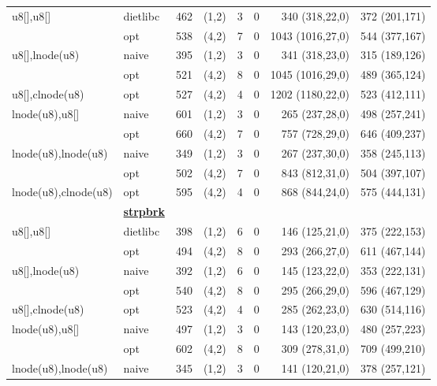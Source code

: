 \begin{table}
\begin{center}
\begin{scriptsize}
\begin{tabular}{@{\hspace{2mm}}l@{\hspace{2mm}}l@{\hspace{2mm}}r@{\hspace{2mm}}c@{\hspace{2mm}}r@{\hspace{2mm}}r@{\hspace{2mm}}r@{\hspace{2mm}}r@{\hspace{2mm}}}
u8[],u8[]             & dietlibc     & 462  & (1,2) & 3  & 0 & 340 (318,22,0)      & 372 (201,171)      \\
                      & opt          & 538  & (4,2) & 7  & 0 & 1043 (1016,27,0)    & 544 (377,167)      \\
u8[],lnode(u8)        & naive        & 395  & (1,2) & 3  & 0 & 341 (318,23,0)      & 315 (189,126)      \\
                      & opt          & 521  & (4,2) & 8  & 0 & 1045 (1016,29,0)    & 489 (365,124)      \\
u8[],clnode(u8)       & opt          & 527  & (4,2) & 4  & 0 & 1202 (1180,22,0)    & 523 (412,111)      \\
lnode(u8),u8[]        & naive        & 601  & (1,2) & 3  & 0 & 265 (237,28,0)      & 498 (257,241)      \\
                      & opt          & 660  & (4,2) & 7  & 0 & 757 (728,29,0)      & 646 (409,237)      \\
lnode(u8),lnode(u8)   & naive        & 349  & (1,2) & 3  & 0 & 267 (237,30,0)      & 358 (245,113)      \\
                      & opt          & 502  & (4,2) & 7  & 0 & 843 (812,31,0)      & 504 (397,107)      \\
lnode(u8),clnode(u8)  & opt          & 595  & (4,2) & 4  & 0 & 868 (844,24,0)      & 575 (444,131)      \\
& {\bf \underline{strpbrk}} \\
u8[],u8[]             & dietlibc     & 398  & (1,2) & 6  & 0 & 146 (125,21,0)      & 375 (222,153)      \\
                      & opt          & 494  & (4,2) & 8  & 0 & 293 (266,27,0)      & 611 (467,144)      \\
u8[],lnode(u8)        & naive        & 392  & (1,2) & 6  & 0 & 145 (123,22,0)      & 353 (222,131)      \\
                      & opt          & 540  & (4,2) & 8  & 0 & 295 (266,29,0)      & 596 (467,129)      \\
u8[],clnode(u8)       & opt          & 523  & (4,2) & 4  & 0 & 285 (262,23,0)      & 630 (514,116)      \\
lnode(u8),u8[]        & naive        & 497  & (1,2) & 3  & 0 & 143 (120,23,0)      & 480 (257,223)      \\
                      & opt          & 602  & (4,2) & 8  & 0 & 309 (278,31,0)      & 709 (499,210)      \\
lnode(u8),lnode(u8)   & naive        & 345  & (1,2) & 3  & 0 & 141 (120,21,0)      & 378 (257,121)      \\

\end{tabular}
\end{scriptsize}
\end{center}
\end{table}
